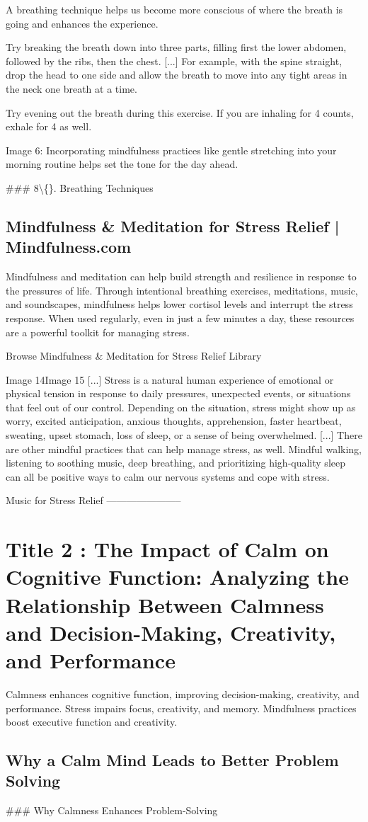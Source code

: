 \documentclass[12pt]{article}
\begin{document}
A breathing technique helps us become more conscious of where the breath is going and enhances the experience.

Try breaking the breath down into three parts, filling first the lower abdomen, followed by the ribs, then the chest. [...] For example, with the spine straight, drop the head to one side and allow the breath to move into any tight areas in the neck one breath at a time.

Try evening out the breath during this exercise. If you are inhaling for 4 counts, exhale for 4 as well.

Image 6: Incorporating mindfulness practices like gentle stretching into your morning routine helps set the tone for the day ahead.

\#\#\# 8\textbackslash\{\}. Breathing Techniques\subsection{Mindfulness \& Meditation for Stress Relief | Mindfulness.com}
Mindfulness and meditation can help build strength and resilience in response to the pressures of life. Through intentional breathing exercises, meditations, music, and soundscapes, mindfulness helps lower cortisol levels and interrupt the stress response. When used regularly, even in just a few minutes a day, these resources are a powerful toolkit for managing stress.

Browse Mindfulness \& Meditation for Stress Relief Library

Image 14Image 15 [...] Stress is a natural human experience of emotional or physical tension in response to daily pressures, unexpected events, or situations that feel out of our control. Depending on the situation, stress might show up as worry, excited anticipation, anxious thoughts, apprehension, faster heartbeat, sweating, upset stomach, loss of sleep, or a sense of being overwhelmed. [...] There are other mindful practices that can help manage stress, as well. Mindful walking, listening to soothing music, deep breathing, and prioritizing high-quality sleep can all be positive ways to calm our nervous systems and cope with stress.

Music for Stress Relief
-----------------------
\section{Title 2 : The Impact of Calm on Cognitive Function: Analyzing the Relationship Between Calmness and Decision-Making, Creativity, and Performance}
Calmness enhances cognitive function, improving decision-making, creativity, and performance. Stress impairs focus, creativity, and memory. Mindfulness practices boost executive function and creativity.\subsection{Why a Calm Mind Leads to Better Problem Solving}
\#\#\# Why Calmness Enhances Problem-Solving
\end{document}

